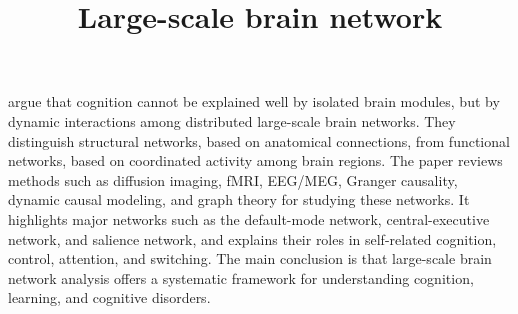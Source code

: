 \documentclass[a4paper]{article}
\title{Large-scale brain network}
\date{}
\begin{document}
    \maketitle
    \seeherefooter{}
    
    \cite{bressler-2010-large-scale-brain-networks-in-cognition-emerging-methods-and-principles} argue that cognition cannot be explained well by isolated brain modules, but by dynamic interactions among distributed large-scale brain networks. They distinguish structural networks, based on anatomical connections, from functional networks, based on coordinated activity among brain regions. The paper reviews methods such as diffusion imaging, fMRI, EEG/MEG, Granger causality, dynamic causal modeling, and graph theory for studying these networks. It highlights major networks such as the default-mode network, central-executive network, and salience network, and explains their roles in self-related cognition, control, attention, and switching. The main conclusion is that large-scale brain network analysis offers a systematic framework for understanding cognition, learning, and cognitive disorders.
    
    
\end{document}
